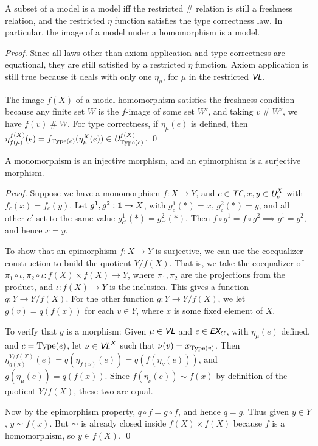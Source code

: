 \documentclass[runningheads,a4paper]{llncs}
\newcommand{\ec}{\textit{\textsf{EX}}_C} %
\newcommand{\tc}{\textit{\textsf{TC}}} %
\newcommand{\vl}{\textit{\textsf{VL}}} %
\newcommand{\uv}{\textit{\textsf{U}}} %
\newcommand{\type}{{\rm Type}}
\newcommand{\fresh}{\mathbin{\#}}
\begin{document}
\begin{theorem}
A subset of a model is a model iff the restricted $\fresh$ relation is still a freshness relation, and the restricted $\eta$ function satisfies the type correctness law. In particular, the image of a model under a homomorphism is a model.
\end{theorem}
\begin{proof}
Since all laws other than axiom application and type correctness are equational, they are still satisfied by a restricted $\eta$ function. Axiom application is still true because it deals with only one $\eta_\mu$, for $\mu$ in the restricted $\vl$.

The image $f(X)$ of a model homomorphism satisfies the freshness condition because any finite set $W$ is the $f$-image of some set $W'$, and taking $v\fresh W'$, we have $f(v)\fresh W$. For type correctness, if $\eta_\mu(e)$ is defined, then $\eta^{f(X)}_{f(\mu)}(e)=f_{\type(e)}(\eta^X_\mu(e)) \in\uv^{f(X)}_{\type(e)}$.
\qed\end{proof}

\begin{theorem}
A monomorphism is an injective morphism, and an epimorphism is a surjective morphism.
\end{theorem}
\begin{proof}
Suppose we have a monomorphism $f:X\to Y$, and $c\in\tc,x,y\in\uv^X_c$ with $f_c(x)=f_c(y)$. Let $g^1,g^2:{\bf 1}\to X$, with $g^1_c(\ast)=x$, $g^2_c(\ast)=y$, and all other $c'$ set to the same value $g^1_{c'}(\ast)=g^2_{c'}(\ast)$. Then $f\circ g^1=f\circ g^2\implies g^1=g^2$, and hence $x=y$.

To show that an epimorphism $f:X\to Y$ is surjective, we can use the coequalizer construction to build the quotient $Y/f(X)$. That is, we take the coequalizer of $\pi_1\circ\iota,\pi_2\circ\iota:f(X)\times f(X)\to Y$, where $\pi_1,\pi_2$ are the projections from the product, and $\iota:f(X)\to Y$ is the inclusion. This gives a function $q:Y\to Y/f(X)$. For the other function $g:Y\to Y/f(X)$, we let $g(v)=q(f(x))$ for each $v\in Y$, where $x$ is some fixed element of $X$.

To verify that $g$ is a morphism: Given $\mu\in\vl$ and $e\in\ec$, with $\eta_\mu(e)$ defined, and $c=\type(e)$, let $\nu\in\vl^X$ such that $\nu(v)=x_{\type(v)}$. Then $\eta^{Y/f(X)}_{g(\mu)}(e)=q(\eta_{f(\nu)}(e))=q(f(\eta_\nu(e)))$, and $g(\eta_\mu(e))=q(f(x))$. Since $f(\eta_\nu(e))\sim f(x)$ by definition of the quotient $Y/f(X)$, these two are equal.

Now by the epimorphism property, $q\circ f=g\circ f$, and hence $q=g$. Thus given $y\in Y$, $y\sim f(x)$. But $\sim$ is already closed inside $f(X)\times f(X)$ because $f$ is a homomorphism, so $y\in f(X)$.
\qed\end{proof}
\end{document}
